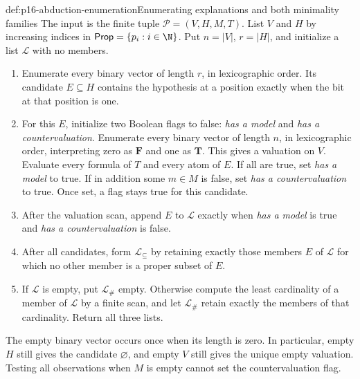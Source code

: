 \begin{hbmethod}{def:p16-abduction-enumeration}{Enumerating explanations and both minimality families}
The input is the finite tuple \(\mathcal P=(V,H,M,T)\). List \(V\)
and \(H\) by increasing indices in \(\mathsf{Prop}=\{p_i:i\in\N\}\).
Put \(n=|V|\), \(r=|H|\), and initialize a list \(\mathcal L\)
with no members.
\begin{enumerate}
\item Enumerate every binary vector of length \(r\), in lexicographic
      order. Its candidate \(E\subseteq H\) contains the hypothesis
      at a position exactly when the bit at that position is one.
\item For this \(E\), initialize two Boolean flags to false:
      \emph{has a model} and \emph{has a countervaluation}. Enumerate
      every binary vector of length \(n\), in lexicographic order,
      interpreting zero as
      \(\mathbf{F}\) and one as \(\mathbf{T}\). This gives a valuation on
      \(V\). Evaluate every formula of \(T\) and every atom of \(E\).
      If all are true, set \emph{has a model} to true. If in addition some
      \(m\in M\) is false, set \emph{has a countervaluation} to true.
      Once set, a flag stays true for this candidate.
\item After the valuation scan, append \(E\) to \(\mathcal L\)
      exactly when \emph{has a model} is true and
      \emph{has a countervaluation} is false.
\item After all candidates, form \(\mathcal L_{\subseteq}\) by
      retaining exactly those members \(E\) of \(\mathcal L\) for
      which no other member is a proper subset of \(E\).
\item If \(\mathcal L\) is empty, put \(\mathcal L_{\#}\) empty.
      Otherwise compute the least cardinality of a member of \(\mathcal L\)
      by a finite scan, and let \(\mathcal L_{\#}\) retain exactly
      the members of that cardinality. Return all three lists.
\end{enumerate}
The empty binary vector occurs once when its length is zero. In particular,
empty \(H\) still gives the candidate \(\varnothing\), and empty
\(V\) still gives the unique empty valuation. Testing all observations
when \(M\) is empty cannot set the countervaluation flag.
\end{hbmethod}

